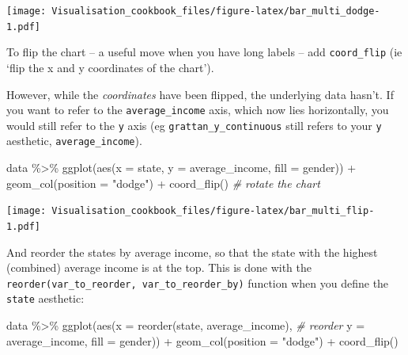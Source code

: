 \documentclass[
]{book}
\newenvironment{Shaded}{\begin{snugshade}}{\end{snugshade}}
\newcommand{\AttributeTok}[1]{\textcolor[rgb]{0.77,0.63,0.00}{#1}}
\newcommand{\CommentTok}[1]{\textcolor[rgb]{0.56,0.35,0.01}{\textit{#1}}}
\newcommand{\FunctionTok}[1]{\textcolor[rgb]{0.00,0.00,0.00}{#1}}
\newcommand{\NormalTok}[1]{#1}
\newcommand{\SpecialCharTok}[1]{\textcolor[rgb]{0.00,0.00,0.00}{#1}}
\newcommand{\StringTok}[1]{\textcolor[rgb]{0.31,0.60,0.02}{#1}}
\begin{document}
\texttt{[image: Visualisation\_cookbook\_files/figure-latex/bar\_multi\_dodge-1.pdf]}

To flip the chart -- a useful move when you have long labels -- add \texttt{coord\_flip} (ie `flip the x and y coordinates of the chart').

However, while the \emph{coordinates} have been flipped, the underlying data hasn't. If you want to refer to the \texttt{average\_income} axis, which now lies horizontally, you would still refer to the \texttt{y} axis (eg \texttt{grattan\_y\_continuous} still refers to your \texttt{y} aesthetic, \texttt{average\_income}).

\begin{Shaded}
\begin{Highlighting}[]
\NormalTok{data }\SpecialCharTok{\%\textgreater{}\%} 
  \FunctionTok{ggplot}\NormalTok{(}\FunctionTok{aes}\NormalTok{(}\AttributeTok{x =}\NormalTok{ state,}
             \AttributeTok{y =}\NormalTok{ average\_income,}
             \AttributeTok{fill =}\NormalTok{ gender)) }\SpecialCharTok{+} 
  \FunctionTok{geom\_col}\NormalTok{(}\AttributeTok{position =} \StringTok{"dodge"}\NormalTok{) }\SpecialCharTok{+} 
  \FunctionTok{coord\_flip}\NormalTok{() }\CommentTok{\# rotate the chart}
\end{Highlighting}
\end{Shaded}

\texttt{[image: Visualisation\_cookbook\_files/figure-latex/bar\_multi\_flip-1.pdf]}

And reorder the states by average income, so that the state with the highest (combined) average income is at the top. This is done with the \texttt{reorder(var\_to\_reorder,\ var\_to\_reorder\_by)} function when you define the \texttt{state} aesthetic:

\begin{Shaded}
\begin{Highlighting}[]
\NormalTok{data }\SpecialCharTok{\%\textgreater{}\%} 
  \FunctionTok{ggplot}\NormalTok{(}\FunctionTok{aes}\NormalTok{(}\AttributeTok{x =} \FunctionTok{reorder}\NormalTok{(state, average\_income), }\CommentTok{\# reorder}
             \AttributeTok{y =}\NormalTok{ average\_income,}
             \AttributeTok{fill =}\NormalTok{ gender)) }\SpecialCharTok{+} 
  \FunctionTok{geom\_col}\NormalTok{(}\AttributeTok{position =} \StringTok{"dodge"}\NormalTok{) }\SpecialCharTok{+} 
  \FunctionTok{coord\_flip}\NormalTok{()}
\end{Highlighting}
\end{Shaded}
\end{document}
